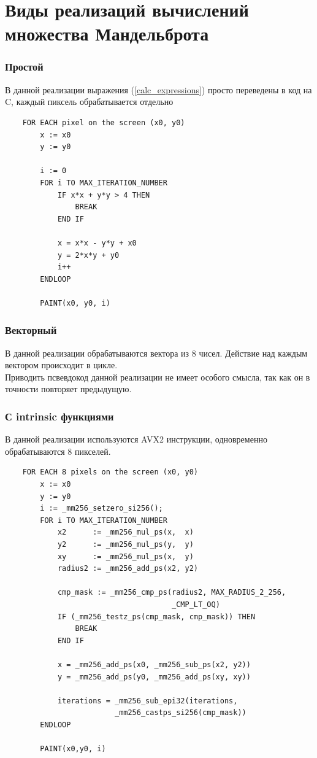 \documentclass[a4paper, 12pt]{article}
\begin{document}
\section*{Виды реализаций вычислений множества Мандельброта}
\subsubsection*{Простой}
В данной реализации выражения (\ref{calc_expressions}) просто переведены в код на C, каждый пиксель обрабатывается отдельно

\begin{lstlisting}
    FOR EACH pixel on the screen (x0, y0)
        x := x0
        y := y0
    
        i := 0
        FOR i TO MAX_ITERATION_NUMBER
            IF x*x + y*y > 4 THEN
                BREAK
            END IF
    
            x = x*x - y*y + x0
            y = 2*x*y + y0
            i++
        ENDLOOP
        
        PAINT(x0, y0, i)
\end{lstlisting}

\subsubsection*{Векторный}
В данной реализации обрабатываются вектора из 8 чисел. Действие над каждым вектором происходит в цикле.\\

Приводить псвевдокод данной реализации не имеет особого смысла, так как он в точности повторяет предыдущую. 
\subsubsection*{С intrinsic функциями}
В данной реализации используются AVX2 инструкции, одновременно обрабатываются 8 пикселей.

\begin{lstlisting}
    FOR EACH 8 pixels on the screen (x0, y0)
        x := x0
        y := y0
        i := _mm256_setzero_si256();
        FOR i TO MAX_ITERATION_NUMBER
            x2      := _mm256_mul_ps(x,  x)
            y2      := _mm256_mul_ps(y,  y)
            xy      := _mm256_mul_ps(x,  y)
            radius2 := _mm256_add_ps(x2, y2)
    
            cmp_mask := _mm256_cmp_ps(radius2, MAX_RADIUS_2_256,
                                      _CMP_LT_OQ)
            IF (_mm256_testz_ps(cmp_mask, cmp_mask)) THEN
                BREAK
            END IF
    
            x = _mm256_add_ps(x0, _mm256_sub_ps(x2, y2))
            y = _mm256_add_ps(y0, _mm256_add_ps(xy, xy))
    
            iterations = _mm256_sub_epi32(iterations,
                         _mm256_castps_si256(cmp_mask))
        ENDLOOP
    
        PAINT(x0,y0, i)
\end{lstlisting}
\end{document}

